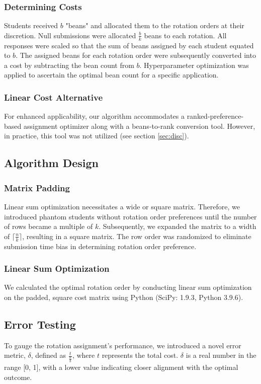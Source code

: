\documentclass{article}
\begin{document}
\subsubsection{Determining Costs}
\label{sec:cost}
Students received $b$ "beans" and allocated them to the rotation orders at their discretion. Null submissions were allocated $\frac{b}{k}$ beans to each rotation. All responses were scaled so that the sum of beans assigned by each student equated to $b$. The assigned beans for each rotation order were subsequently converted into a cost by subtracting the bean count from $b$. Hyperparameter optimization was applied to ascertain the optimal bean count for a specific application.

\subsubsection{Linear Cost Alternative}
For enhanced applicability, our algorithm accommodates a ranked-preference-based assignment optimizer along with a beans-to-rank conversion tool. However, in practice, this tool was not utilized (see section \ref{sec:disc}). 

\subsection{Algorithm Design}
\subsubsection{Matrix Padding}
Linear sum optimization necessitates a wide or square matrix. Therefore, we introduced phantom students without rotation order preferences until the number of rows became a multiple of $k$. Subsequently, we expanded the matrix to a width of $\lceil\frac{n}{k}\rceil$, resulting in a square matrix. The row order was randomized to eliminate submission time bias in determining rotation order preference.

\subsubsection{Linear Sum Optimization}
We calculated the optimal rotation order by conducting linear sum optimization on the padded, square cost matrix using Python (SciPy: 1.9.3, Python 3.9.6).

\subsection{Error Testing}
To gauge the rotation assignment's performance, we introduced a novel error metric, $\delta$, defined as $\frac{t}{\frac{n}{b}}$, where $t$ represents the total cost. $\delta$ is a real number in the range [0, 1], with a lower value indicating closer alignment with the optimal outcome.
\end{document}
